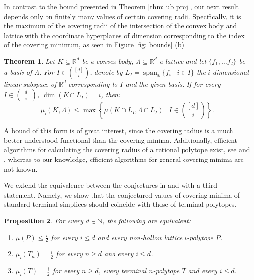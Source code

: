 \documentclass{amsart}
\newtheorem{theorem}{Theorem}[section]
\newtheorem{proposition}[theorem]{Proposition}
\theoremstyle{definition}
\theoremstyle{remark}
\newcommand{\R}{\mathbb{R}}
\newcommand{\N}{\mathbb{N}}
\begin{document}
In contrast to the bound presented in Theorem \ref{thm: ub proj}, our next result depends only on finitely many values of certain covering radii. Specifically, it is the maximum of the covering radii of the intersection of the convex body and lattice with the coordinate hyperplanes of dimension corresponding to the index of the covering minimum, as seen in Figure \ref{fig: bounds} (b).
\begin{theorem}\label{thm: ub intersec}
Let $K\subseteq \R^d$ be a convex body, $\Lambda \subseteq \R^d$ a lattice and let $\{ f_1, \dots f_d\}$ be a basis of $\Lambda$. For $I\in {[d]\choose i}$, denote by $L_I=\operatorname{span}_\R\{f_i\; |\; i\in I \}$ the $i$-dimensional linear subspace of $\R^d$ corresponding to $I$ and the given basis. If for every $I\in {[d]\choose i}$, $\dim(K\cap L_I)=i$, then:
$$\mu_i(K, \Lambda)\leqslant \max\left\{ \mu(K\cap L_I, \Lambda \cap L_I)\;| \; I\in {[d]\choose i} \right\}.$$
\end{theorem}

A bound of this form is of great interest, since the covering radius is a much better understood functional than the covering minima. Additionally, efficient algorithms for calculating the covering radius of a rational polytope exist, see \cite{DavidPacoPaco} and \cite{Cslovjecsek}, whereas to our knowledge, efficient algorithms for general covering minima are not known.


We extend the equivalence between the conjectures in \cite{MerinoSchymura} and \cite{CodenottiSantosSchymura}with a third statement. Namely, we show that the conjectured values of covering minima of standard terminal simplices should coincide with those of terminal polytopes.
\begin{proposition}\label{thm: big equivalence}
For every $d\in \N$, the following are equivalent:
\begin{enumerate}[label=\roman*)]
\item $\mu(P)\leqslant\frac{i}{2}$ for every $i\leqslant d$ and every non-hollow lattice $i$-polytope $P$.

\item $\mu_i(T_n)=\frac{i}{2}$ for every $n\geq d$ and every $i\leqslant d$.

\item $\mu_i(T)=\frac{i}{2}$ for every $n\geq d$, every terminal $n$-polytope $T$ and every $i\leqslant d$.

\end{enumerate}
\end{proposition}
\end{document}
